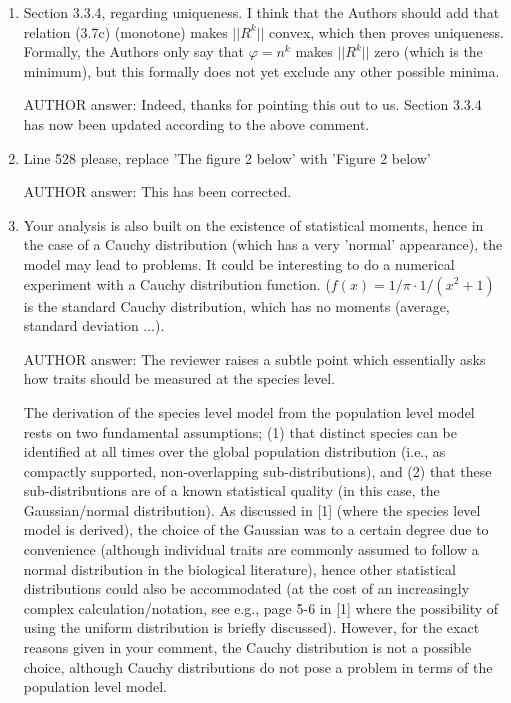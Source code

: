 \documentclass[a4paper,11pt]{scrartcl}
\let\phi\varphi
\begin{document}
\begin{enumerate}
\item
Section 3.3.4, regarding uniqueness. I think that the Authors should add that relation (3.7c) (monotone) makes $||R^k||$ convex, which then proves uniqueness. Formally, the Authors only say that $\phi = n^k$ makes $||R^k||$ zero (which is the minimum), but this formally does not yet exclude any other possible minima.

AUTHOR answer: Indeed, thanks for pointing this out to us. Section 3.3.4 has now been updated according to the above comment.

\item
Line 528 please, replace 'The figure 2 below' with 'Figure 2 below'

AUTHOR answer: This has been corrected.

\item
Your analysis is also built on the existence of statistical moments, hence in the case of a Cauchy distribution (which has a very 'normal' appearance), the model may lead to problems. It could be interesting to do a numerical experiment with a Cauchy distribution function. ($f(x) = 1/\pi \cdot 1 / (x^2 + 1)$ is the standard Cauchy distribution, which has no moments (average, standard deviation ...).

AUTHOR answer: The reviewer raises a subtle point which essentially asks how traits should be measured at the species level.

The derivation of the species level model from the population level model rests on two fundamental assumptions; (1) that distinct species can be identified at all times over the global population distribution (i.e., as compactly supported, non-overlapping sub-distributions), and (2) that these sub-distributions are of a known statistical quality (in this case, the Gaussian/normal distribution). As discussed in [1] (where the species level model is derived), the choice of the Gaussian was to a certain degree due to convenience (although individual traits are commonly assumed to follow a normal distribution in the biological literature), hence other statistical distributions could also be accommodated (at the cost of an increasingly complex calculation/notation, see e.g., page 5-6 in [1] where the possibility of using the uniform distribution is briefly discussed). However, for the exact reasons given in your comment, the Cauchy distribution is not a possible choice, although Cauchy distributions do not pose a problem in terms of the population level model. \\


\end{enumerate}
\end{document}
